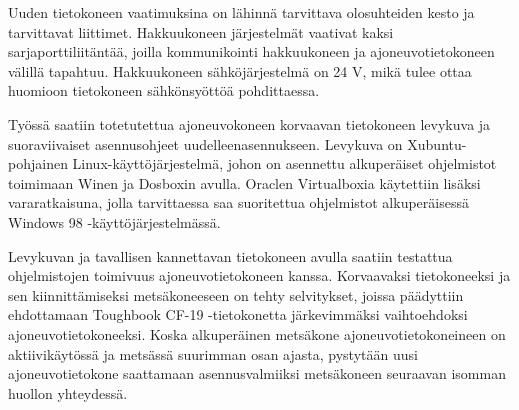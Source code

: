 Uuden tietokoneen vaatimuksina on lähinnä tarvittava olosuhteiden kesto ja tarvittavat liittimet. Hakkuukoneen järjestelmät vaativat kaksi sarjaporttiliitäntää, joilla kommunikointi hakkuukoneen ja ajoneuvotietokoneen välillä tapahtuu. Hakkuukoneen sähköjärjestelmä on 24 V, mikä tulee ottaa huomioon tietokoneen sähkönsyöttöä pohdittaessa.

Työssä saatiin totetutettua ajoneuvokoneen korvaavan tietokoneen levykuva ja suoraviivaiset asennusohjeet uudelleenasennukseen. Levykuva on Xubuntu-pohjainen Linux-käyttöjärjestelmä, johon on asennettu alkuperäiset ohjelmistot toimimaan Winen ja Dosboxin avulla. Oraclen Virtualboxia käytettiin lisäksi vararatkaisuna, jolla tarvittaessa saa suoritettua ohjelmistot alkuperäisessä Windows 98 -käyttöjärjestelmässä.

Levykuvan ja tavallisen kannettavan tietokoneen avulla saatiin testattua ohjelmistojen toimivuus ajoneuvotietokoneen kanssa. Korvaavaksi tietokoneeksi ja sen kiinnittämiseksi metsäkoneeseen on tehty selvitykset, joissa päädyttiin ehdottamaan Toughbook CF-19 -tietokonetta järkevimmäksi vaihtoehdoksi ajoneuvotietokoneeksi. Koska alkuperäinen metsäkone ajoneuvotietokoneineen on aktiivikäytössä ja metsässä suurimman osan ajasta, pystytään uusi ajoneuvotietokone saattamaan asennusvalmiiksi metsäkoneen seuraavan isomman huollon yhteydessä.









